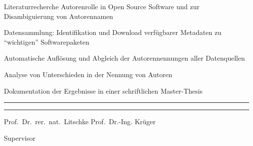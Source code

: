 \documentclass[a4paper,DIV=12]{scrartcl}
\begin{document}
\begin{compactenum}
    \item Literaturrecherche Autorenrolle in Open Source Software und zur Disambiguierung von Autorennamen 
    \item Datensammlung: Identifikation und Download verfügbarer Metadaten zu \enquote{wichtigen} Softwarepaketen
    \item Automatische Auflösung und Abgleich der Autorennennungen aller Datenquellen
    \item Analyse von Unterschieden in der Nennung von Autoren
    \item Dokumentation der Ergebnisse in einer schriftlichen Master-Thesis
\end{compactenum}

\vfill{}

\noindent\rule{5cm}{.4pt}\hfill\rule{5cm}{.4pt}\par
\noindent Prof.\ Dr.\ rer.\ nat.\ Litschke \hfill Prof.\ Dr.-Ing. Krüger\par
{} \hfill {\footnotesize Supervisor}

\printbibliography
\end{document}
